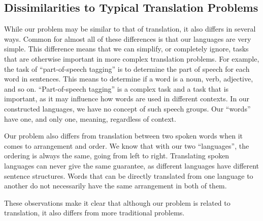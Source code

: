 \subsection{Dissimilarities to Typical Translation Problems}
While our problem may be similar to that of translation, it also differs in several ways. Common for almost all of these differences is that our languages are very simple. This difference means that we can simplify, or completely ignore, tasks that are otherwise important in more complex translation problems. For example, the task of ``part-of-speech tagging'' is to determine the part of speech for each word in sentences. This means to determine if a word is a noun, verb, adjective, and so on. ``Part-of-speech tagging'' is a complex task and a task that is important, as it may influence how words are used in different contexts. In our constructed languages, we have no concept of such speech groups. Our ``words'' have one, and only one, meaning, regardless of context. 

Our problem also differs from translation between two spoken words when it comes to arrangement and order. We know that with our two ``languages'', the ordering is always the same, going from left to right. Translating spoken languages can never give the same guarantee, as different languages have different sentence structures. Words that can be directly translated from one language to another do not necessarily have the same arrangement in both of them.

These observations make it clear that although our problem is related to translation, it also differs from more traditional problems. 